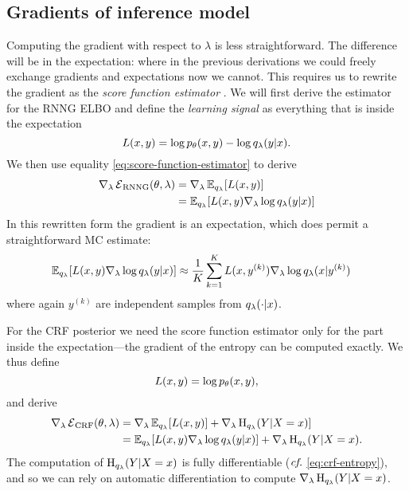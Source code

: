   \subsection{Gradients of inference model}
    Computing the gradient with respect to $\lambda$ is less straightforward. The difference will be in the expectation: where in the previous derivations we could freely exchange gradients and expectations now we cannot. This requires us to rewrite the gradient as the \textit{score function estimator} \citep{fu2006gradient}.  We will first derive the estimator for the RNNG ELBO and define the \textit{learning signal} as everything that is inside the expectation
    \begin{equation}
      L(x, y) = \log p_{\theta}(x, y) - \log q_{\lambda}(y | x).
    \end{equation}
    We then use equality \ref{eq:score-function-estimator} to derive
    \begin{align}
      \nabla_{\lambda} \operatorname{\mathcal{E}}_{\text{RNNG}}(\theta, \lambda)
        &= \nabla_{\lambda} \operatorname{\mathbb{E}}_{q_{\lambda}} [ L(x, y) ]  \nonumber \\
        &= \operatorname{\mathbb{E}}_{q_{\lambda}} [ L(x, y) \nabla_{\lambda} \log q_{\lambda}(y | x) ]
    \end{align}
    In this rewritten form the gradient is an expectation, which does permit a straightforward MC estimate:
    \begin{align}
      \operatorname{\mathbb{E}}_{q_{\lambda}} [ L(x, y) \nabla_{\lambda} \log q_{\lambda}(y | x) ]
        &\approx \frac{1}{K}\sum_{k=1}^K  L(x, y^{(k)})\nabla_{\lambda} \log q_{\lambda}(x | y^{(k)})
    \end{align}
    where again $y^{(k)}$ are independent samples from $q_{\lambda}(\cdot | x)$.

    For the CRF posterior we need the score function estimator only for the part inside the expectation---the gradient of the entropy can be computed exactly. We thus define
    \begin{equation}
      L(x, y) = \log p_{\theta}(x, y),
    \end{equation}
    and derive
    \begin{align}
      \nabla_{\lambda} \operatorname{\mathcal{E}}_{\text{CRF}}(\theta, \lambda)
        &= \nabla_{\lambda} \operatorname{\mathbb{E}}_{q_{\lambda}} [ L(x, y) ] +  \nabla_{\lambda} \operatorname{H}_{q_{\lambda}}( Y | X = x) ] \nonumber  \\
        &= \operatorname{\mathbb{E}}_{q_{\lambda}} [ L(x, y) \nabla_{\lambda} \log q_{\lambda}(y | x) ] + \nabla_{\lambda} \operatorname{H}_{q_{\lambda}}( Y | X = x).
    \end{align}
    The computation of $\operatorname{H}_{q_{\lambda}}( Y | X = x)$ is fully differentiable ($\emph{cf.}$ \ref{eq:crf-entropy}), and so we can rely on automatic differentiation to compute $\nabla_{\lambda} \operatorname{H}_{q_{\lambda}}( Y | X = x)$.

